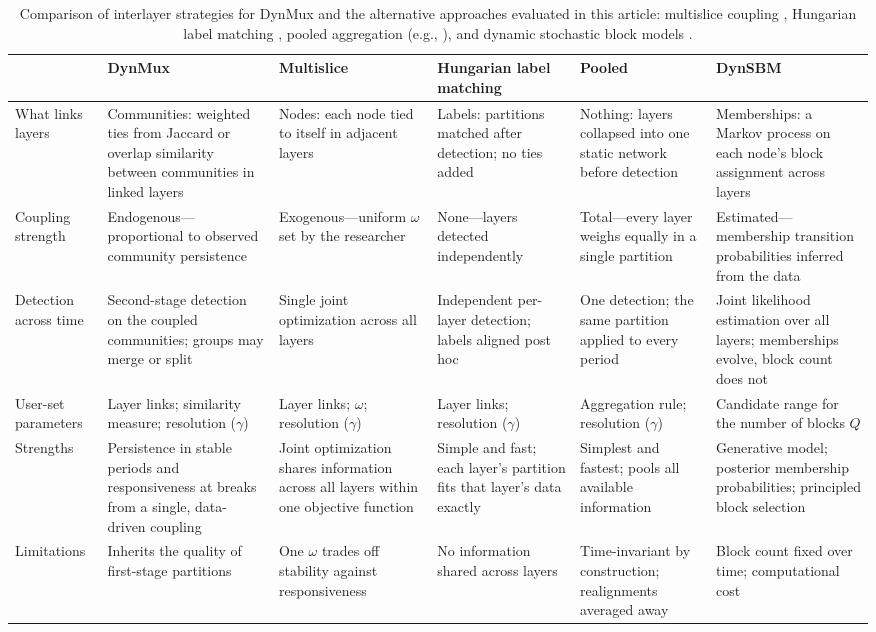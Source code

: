 \documentclass[11pt, letterpaper]{article}
\begin{document}
\begin{table}[t]
\scriptsize
\centering
\caption{Comparison of interlayer strategies for DynMux and the alternative
approaches evaluated in this article: multislice coupling
\citep{mucha2010community}, Hungarian label matching
\citep{kuhn1955hungarian}, pooled aggregation (e.g.,
\citealp{moody2004structure}), and dynamic stochastic block models
\citep{matias2017statistical}.}
\label{tab:mechanisms}
\begin{tabular}{@{}L{1.9cm}L{2.5cm}L{2.4cm}L{2.4cm}L{2.4cm}L{2.4cm}@{}}
\toprule
 & DynMux & Multislice & Hungarian label matching & Pooled & DynSBM \\
\midrule
What links layers &
Communities: weighted ties from Jaccard or overlap similarity between
communities in linked layers &
Nodes: each node tied to itself in adjacent layers &
Labels: partitions matched after detection; no ties added &
Nothing: layers collapsed into one static network before detection &
Memberships: a Markov process on each node's block assignment across
layers \\
\addlinespace
Coupling strength &
Endogenous---proportional to observed community persistence &
Exogenous---uniform $\omega$ set by the researcher &
None---layers detected independently &
Total---every layer weighs equally in a single partition &
Estimated---membership transition probabilities inferred from the data \\
\addlinespace
Detection across time &
Second-stage detection on the coupled communities; groups may merge or
split &
Single joint optimization across all layers &
Independent per-layer detection; labels aligned post hoc &
One detection; the same partition applied to every period &
Joint likelihood estimation over all layers; memberships evolve, block
count does not \\
\addlinespace
User-set parameters &
Layer links; similarity measure; resolution ($\gamma$) &
Layer links; $\omega$; resolution ($\gamma$) &
Layer links; resolution ($\gamma$) &
Aggregation rule; resolution ($\gamma$) &
Candidate range for the number of blocks $Q$ \\
\addlinespace
Strengths &
Persistence in stable periods and responsiveness at breaks from a single,
data-driven coupling &
Joint optimization shares information across all layers within one
objective function &
Simple and fast; each layer's partition fits that layer's data exactly &
Simplest and fastest; pools all available information &
Generative model; posterior membership probabilities; principled block
selection \\
\addlinespace
Limitations &
Inherits the quality of first-stage partitions &
One $\omega$ trades off stability against responsiveness &
No information shared across layers &
Time-invariant by construction; realignments averaged away &
Block count fixed over time; computational cost\\
\bottomrule
\end{tabular}
\end{table}
\end{document}
